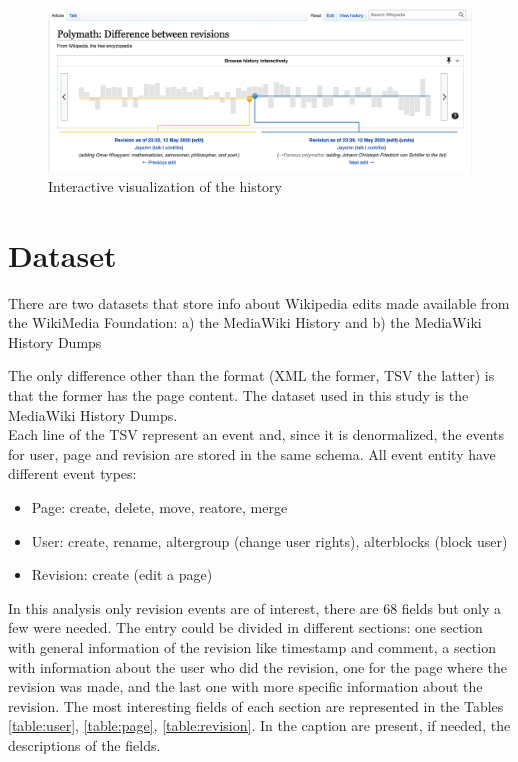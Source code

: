 \begin{figure}[H]
    \centering
    \includegraphics[width=1\textwidth]{./chapters/02/assets/history.png}
    \caption{Interactive visualization of the history}
    \label{fig:history}
\end{figure}


\section{Dataset}
There are two datasets that store info about Wikipedia edits made available from the WikiMedia
Foundation: a) the MediaWiki History and b) the MediaWiki History Dumps


The only difference other than the format (XML the former, TSV the latter) is that the former has the
page content. The dataset used in this study is the MediaWiki History Dumps.\\

Each line of the TSV represent an event and, since it is denormalized, the events for user, page and
revision are stored in the same schema.
All event entity have different event types:
\begin{itemize}
    \item Page: create, delete, move, reatore, merge  
    \item User: create, rename, altergroup (change user rights), alterblocks (block user)
    \item Revision: create (edit a page)
\end{itemize}

In this analysis only revision events are of interest, there are 68 fields but only a few were
needed. The entry could be divided in different sections: one section with general information of
the revision like timestamp and comment, a section with information about the user who did the
revision, one for the page where the revision was made, and the last one with more specific
information about the revision. The most interesting fields of each section are represented in the Tables 
\ref{table:user}, \ref{table:page}, \ref{table:revision}. In the caption are present, if
needed, the descriptions of the fields.


